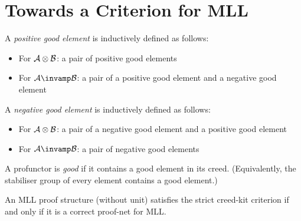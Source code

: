 \section{Towards a Criterion for MLL}

A \emph{positive good element} is inductively defined as follows:
\begin{itemize}
    \item For \( \mathcal{A} \otimes \mathcal{B} \): a pair of positive good elements
    \item For \( \creed \llpar \creedb \): a pair of a positive good element and a negative good element
\end{itemize}
A \emph{negative good element} is inductively defined as follows:
\begin{itemize}
    \item For \( \mathcal{A} \otimes \mathcal{B} \): a pair of a negative good element and a positive good element
    \item For \( \creed \llpar \creedb \): a pair of negative good elements
\end{itemize}

A profunctor is \emph{good} if it contains a good element in its creed.
(Equivalently, the stabiliser group of every element contains a good element.)

\begin{conjecture}
    An MLL proof structure (without unit) satisfies the strict creed-kit criterion if and only if it is a correct proof-net for MLL.
\end{conjecture}
